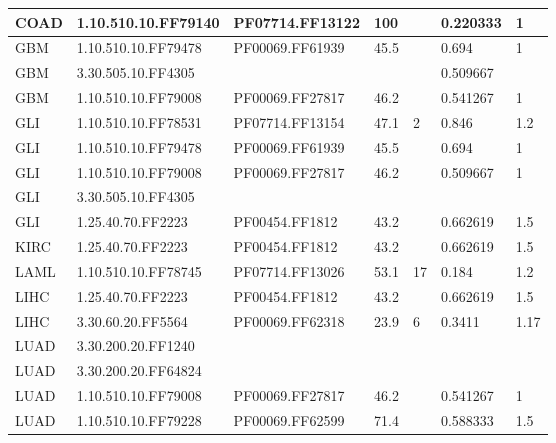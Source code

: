 \documentclass[a4paper, 11pt]{article}
\begin{document}
\begin{table}[!htbp]
\begin{tabular}{|l|l|l|l|l|l|l|}
COAD         & 1.10.510.10.FF79140  & PF07714.FF13122 & 100       &             & 0.220333          & 1        \\ \hline
GBM          & 1.10.510.10.FF79478  & PF00069.FF61939 & 45.5      &             & 0.694             & 1        \\ \hline
GBM          & 3.30.505.10.FF4305   &                 &           &             & 0.509667          &          \\ \hline
GBM          & 1.10.510.10.FF79008  & PF00069.FF27817 & 46.2      &             & 0.541267          & 1        \\ \hline
GLI          & 1.10.510.10.FF78531  & PF07714.FF13154 & 47.1      & 2           & 0.846             & 1.2      \\ \hline
GLI          & 1.10.510.10.FF79478  & PF00069.FF61939 & 45.5      &             & 0.694             & 1        \\ \hline
GLI          & 1.10.510.10.FF79008  & PF00069.FF27817 & 46.2      &             & 0.509667          & 1        \\ \hline
GLI          & 3.30.505.10.FF4305   &                 &           &             &                   &          \\ \hline
GLI          & 1.25.40.70.FF2223    & PF00454.FF1812  & 43.2      &             & 0.662619          & 1.5      \\ \hline
KIRC         & 1.25.40.70.FF2223    & PF00454.FF1812  & 43.2      &             & 0.662619          & 1.5      \\ \hline
LAML         & 1.10.510.10.FF78745  & PF07714.FF13026 & 53.1      & 17          & 0.184             & 1.2      \\ \hline
LIHC         & 1.25.40.70.FF2223    & PF00454.FF1812  & 43.2      &             & 0.662619          & 1.5      \\ \hline
LIHC         & 3.30.60.20.FF5564    & PF00069.FF62318 & 23.9      & 6           & 0.3411            & 1.17     \\ \hline
LUAD         & 3.30.200.20.FF1240   &                 &           &             &                   &          \\ \hline
LUAD         & 3.30.200.20.FF64824  &                 &           &             &                   &          \\ \hline
LUAD         & 1.10.510.10.FF79008  & PF00069.FF27817 & 46.2      &             & 0.541267          & 1        \\ \hline
LUAD         & 1.10.510.10.FF79228  & PF00069.FF62599 & 71.4      &             & 0.588333          & 1.5      \\ \hline

\end{tabular}
\end{table}
\end{document}
